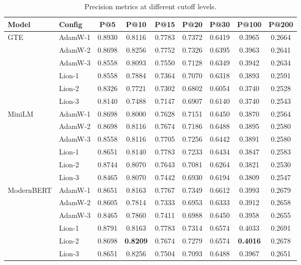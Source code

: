 \documentclass[conference]{IEEEtran}
\begin{document}
\begin{table}[t]
\centering
\caption{Precision metrics at different cutoff levels.}
\label{tab:precision_metrics}
\small
\begin{tabular}{llccccccc}
\toprule
\textbf{Model} & \textbf{Config} & \textbf{P@5} & \textbf{P@10} & \textbf{P@15} & \textbf{P@20} & \textbf{P@30} & \textbf{P@100} & \textbf{P@200} \\
\midrule
\multirow{6}{*}{GTE} & AdamW-1 & 0.8930 & 0.8116 & 0.7783 & 0.7372 & 0.6419 & 0.3965 & 0.2664 \\
 & AdamW-2 & 0.8698 & 0.8256 & 0.7752 & 0.7326 & 0.6395 & 0.3963 & 0.2641 \\
 & AdamW-3 & 0.8558 & 0.8093 & 0.7550 & 0.7128 & 0.6349 & 0.3942 & 0.2634 \\
 & Lion-1 & 0.8558 & 0.7884 & 0.7364 & 0.7070 & 0.6318 & 0.3893 & 0.2591 \\
 & Lion-2 & 0.8326 & 0.7721 & 0.7302 & 0.6802 & 0.6054 & 0.3740 & 0.2528 \\
 & Lion-3 & 0.8140 & 0.7488 & 0.7147 & 0.6907 & 0.6140 & 0.3740 & 0.2543 \\
\midrule
\multirow{6}{*}{MiniLM} & AdamW-1 & 0.8698 & 0.8000 & 0.7628 & 0.7151 & 0.6450 & 0.3870 & 0.2564 \\
 & AdamW-2 & 0.8698 & 0.8116 & 0.7674 & 0.7186 & 0.6488 & 0.3895 & 0.2580 \\
 & AdamW-3 & 0.8558 & 0.8116 & 0.7705 & 0.7256 & 0.6442 & 0.3891 & 0.2580 \\
 & Lion-1 & 0.8651 & 0.8140 & 0.7783 & 0.7233 & 0.6434 & 0.3847 & 0.2583 \\
 & Lion-2 & 0.8744 & 0.8070 & 0.7643 & 0.7081 & 0.6264 & 0.3821 & 0.2530 \\
 & Lion-3 & 0.8465 & 0.8070 & 0.7442 & 0.6930 & 0.6194 & 0.3809 & 0.2547 \\
\midrule
\multirow{6}{*}{ModernBERT} & AdamW-1 & 0.8651 & 0.8163 & 0.7767 & 0.7349 & 0.6612 & 0.3993 & 0.2679 \\
 & AdamW-2 & 0.8605 & 0.7814 & 0.7333 & 0.6953 & 0.6333 & 0.3912 & 0.2658 \\
 & AdamW-3 & 0.8465 & 0.7860 & 0.7411 & 0.6988 & 0.6450 & 0.3958 & 0.2655 \\
 & Lion-1 & 0.8791 & 0.8163 & 0.7783 & 0.7314 & 0.6574 & 0.4033 & 0.2691 \\
 & Lion-2 & 0.8698 & \textbf{0.8209} & 0.7674 & 0.7279 & 0.6574 & \textbf{0.4016} & 0.2678 \\
 & Lion-3 & 0.8651 & 0.8256 & 0.7504 & 0.7093 & 0.6488 & 0.3967 & 0.2651 \\
\bottomrule
\end{tabular}
\end{table}
\end{document}
